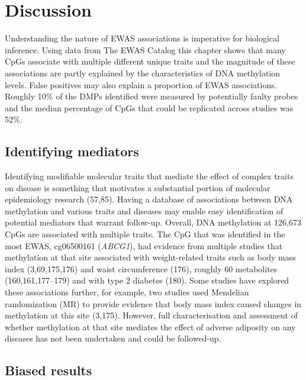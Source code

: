 \documentclass[11pt,twoside]{bristolthesis}
\begin{document}
\hypertarget{discussion-04}{%
\section{Discussion}\label{discussion-04}}

Understanding the nature of EWAS associations is imperative for biological inference. Using data from The EWAS Catalog this chapter shows that many CpGs associate with multiple different unique traits and the magnitude of these associations are partly explained by the characteristics of DNA methylation levels. False positives may also explain a proportion of EWAS associations. Roughly 10\% of the DMPs identified were measured by potentially faulty probes and the median percentage of CpGs that could be replicated across studies was 52\%.

\hypertarget{identifying-mediators}{%
\subsection{Identifying mediators}\label{identifying-mediators}}

Identifying modifiable molecular traits that mediate the effect of complex traits on disease is something that motivates a substantial portion of molecular epidemiology research (57,85). Having a database of associations between DNA methylation and various traits and diseases may enable easy identification of potential mediators that warrant follow-up. Overall, DNA methylation at 126,673 CpGs are associated with multiple traits. The CpG that was identified in the most EWAS, cg06500161 (\emph{ABCG1}), had evidence from multiple studies that methylation at that site associated with weight-related traits such as body mass index (3,69,175,176) and waist circumference (176), roughly 60 metabolites (160,161,177--179) and with type 2 diabetes (180). Some studies have explored these associations further, for example, two studies used Mendelian randomization (MR) to provide evidence that body mass index caused changes in methylation at this site (3,175). However, full characterisation and assessment of whether methylation at that site mediates the effect of adverse adiposity on any diseases has not been undertaken and could be followed-up.

\hypertarget{biased-results}{%
\subsection{Biased results}\label{biased-results}}
\end{document}
